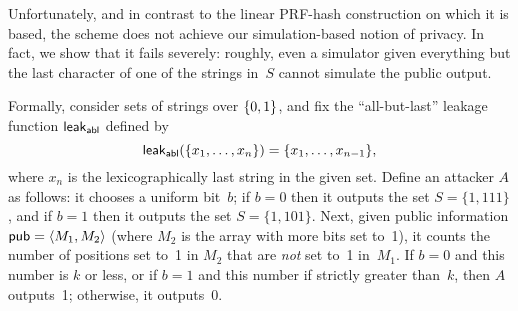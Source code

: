   Unfortunately, and in contrast to the linear
PRF-hash construction on which it is based, the scheme does not
achieve our simulation-based notion of privacy. In fact, we show
that it fails severely: roughly, even a simulator given everything
but the last character of one of the strings in~$S$ cannot simulate
the public output.


 

Formally, consider sets of strings over $\{0,1\}$, and fix the
``all-but-last'' leakage function ${\sf leak}_{\mathsf{abl}}$ defined by
\[{\sf leak}_{\mathsf{abl}}(\{x_1, \ldots, x_n\}) = \{x_1, \ldots, x_{n-1}\},\]
where $x_n$ is the lexicographically last string in the given set.
 Define an attacker $A$ as follows: it chooses a uniform
bit~$b$; if $b=0$ then it outputs the set $S=\{1,111\}$, and if
$b=1$ then it outputs the set $S=\{1, 101\}$. Next, given public
information ${\sf pub} = \langle M_1, M_2 \rangle$ (where $M_2$ is the
array with more bits set to~1), it counts the number of positions
set to~1 in $M_2$ that are \emph{not} set to~1 in~$M_1$. If $b=0$
and this number is $k$ or less, or if $b=1$ and this number if
strictly greater than~$k$, then $A$ outputs~1; otherwise, it
outputs~0.

